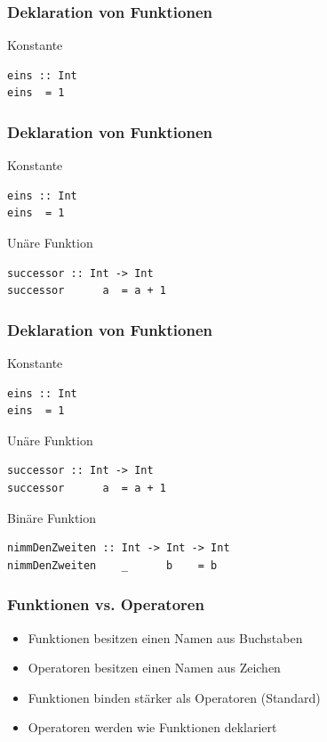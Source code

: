 \begin{frame}[fragile]
\frametitle{Deklaration von Funktionen} 
\begin{exampleblock}{Konstante}
\begin{lstlisting}
eins :: Int
eins  = 1
\end{lstlisting}
\end{exampleblock}
\end{frame}

\begin{frame}[fragile]
\frametitle{Deklaration von Funktionen} 
\begin{exampleblock}{Konstante}
\begin{lstlisting}
eins :: Int
eins  = 1
\end{lstlisting}
\end{exampleblock}
\begin{exampleblock}{Unäre Funktion}
\begin{lstlisting}
successor :: Int -> Int
successor      a  = a + 1
\end{lstlisting}
\end{exampleblock}
\end{frame}

\begin{frame}[fragile]
\frametitle{Deklaration von Funktionen} 
\vspace*{-2.5ex}
\begin{exampleblock}{Konstante}
\begin{lstlisting}
eins :: Int
eins  = 1
\end{lstlisting}
\end{exampleblock}
\vspace*{-3ex}
\begin{exampleblock}{Unäre Funktion}
\begin{lstlisting}
successor :: Int -> Int
successor      a  = a + 1
\end{lstlisting}
\end{exampleblock}
\vspace*{-3ex}
\begin{exampleblock}{Binäre Funktion}
\begin{lstlisting}
nimmDenZweiten :: Int -> Int -> Int
nimmDenZweiten    _      b    = b
\end{lstlisting}
\end{exampleblock}
\end{frame}

\begin{frame}
\frametitle{Funktionen vs. Operatoren}
\begin{block}{\vspace*{-3ex}}
\begin{itemize}
  \item Funktionen besitzen einen Namen aus Buchstaben
  \item Operatoren besitzen einen Namen aus Zeichen
  \item Funktionen binden stärker als Operatoren (Standard)
  \item Operatoren werden wie Funktionen deklariert
\end{itemize}
\end{block}
\end{frame}

